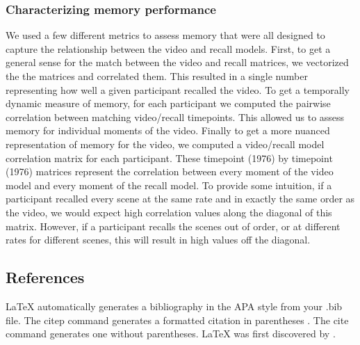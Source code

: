 \documentclass[a4paper,man,natbib,floatsintext]{apa6}
\begin{document}
\subsubsection{Characterizing memory performance}
We used a few different metrics to assess memory that were all designed to capture the relationship between the video and recall models.  First, to get a general sense for the match between the video and recall matrices, we vectorized the the matrices and correlated them.  This resulted in a single number representing how well a given participant recalled the video. To get a temporally dynamic measure of memory, for each participant we computed the pairwise correlation between matching video/recall timepoints.  This allowed us to assess memory for individual moments of the video. Finally to get a more nuanced representation of memory for the video, we computed a video/recall model correlation matrix for each participant. These timepoint (1976) by timepoint (1976) matrices represent the correlation between every moment of the video model and every moment of the recall model. To provide some intuition, if a participant recalled every scene at the same rate and in exactly the same order as the video, we would expect high correlation values along the diagonal of this matrix. However, if a participant recalls the scenes out of order, or at different rates for different scenes, this will result in high values off the diagonal.

\subsection{References}

LaTeX automatically generates a bibliography in the APA style from your .bib file. The citep command generates a formatted citation in parentheses \citep{Lamport1986}. The cite command generates one without parentheses. LaTeX was first discovered by \cite{Lamport1986}.






\end{document}
